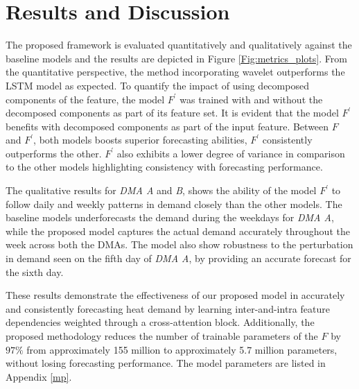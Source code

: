 \section{Results and Discussion}

The proposed framework is evaluated quantitatively and qualitatively against the baseline models and the results are depicted in Figure \ref{Fig:metrics_plots}. From the quantitative perspective, the method incorporating wavelet outperforms the LSTM model as expected. To quantify the impact of using decomposed components of the feature, the model $F^{'}$ was trained with and without the decomposed components as part of its feature set. It is evident that the model $F^{'}$ benefits with decomposed components as part of the input feature. Between $F$ and $F^{'}$, both models boosts superior forecasting abilities, $F^{'}$ consistently outperforms the other. $F^{'}$ also exhibits a lower degree of variance in comparison to the other models highlighting consistency with forecasting performance.

The qualitative results for \textit{DMA A} and \textit{B}, shows the ability of the model $F^{'}$  to follow daily and weekly patterns in demand closely than the other models. The baseline models  underforecasts the demand during the weekdays for \textit{DMA A}, while the proposed model captures the actual demand accurately throughout the week across both the DMAs. The model also show robustness to the perturbation in demand seen on the fifth day of \textit{DMA A}, by providing an accurate forecast for the sixth day. 


These results demonstrate the effectiveness of our proposed model in accurately and consistently forecasting heat demand by learning inter-and-intra feature dependencies weighted through a cross-attention block. Additionally, the proposed methodology reduces the number of trainable parameters of the $F$ by $97\%$ from approximately 155 million to approximately 5.7 million parameters, without losing forecasting performance. The model parameters are listed in Appendix \ref{mp}.



